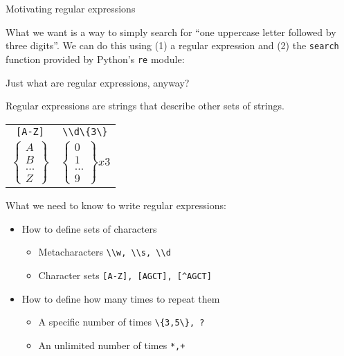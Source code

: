 \documentclass{beamer}
\begin{document}
\begin{frame}{Motivating regular expressions}

What we want is a way to simply search for ``one uppercase letter
followed by three digits''. We can do this using (1) a regular
expression and (2) the \lstinline$search$ function provided
by Python's \lstinline$re$ module:

\vspace{1em}


\end{frame}

\begin{frame}{Just what are regular expressions, anyway?}

Regular expressions are strings that describe other sets of strings.

\begin{center}
\begin{tabular}{cc}
\lstinline$[A-Z]$ & \lstinline$\\d\{3\}$  \\
$\left\{\begin{matrix} A \\ B \\ ... \\ Z \end{matrix}\right\}$ &
$\left\{\begin{matrix} 0 \\ 1 \\ ... \\ 9 \end{matrix}\right\} x 3$ \\
\end{tabular}
\end{center}

What we need to know to write regular expressions:
\begin{itemize}
 \item How to define sets of characters
 \begin{itemize}
   \item Metacharacters  \lstinline$\\w, \\s, \\d$ 
   \item Character sets  \lstinline$[A-Z], [AGCT], [^AGCT]$
 \end{itemize}
 \item How to define how many times to repeat them
 \begin{itemize}
   \item A specific number of times \lstinline$\{3,5\}, ?$
   \item An unlimited number of times \lstinline$*,+$
 \end{itemize}
\end{itemize}

\end{frame}
\end{document}
